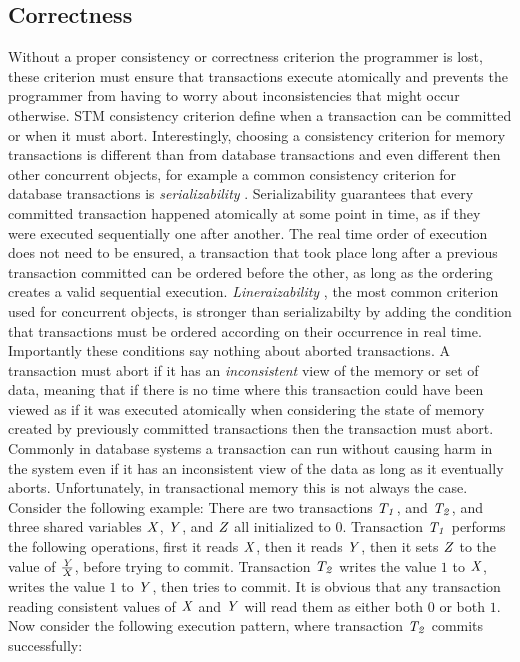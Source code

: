\subsection{Correctness}\label{sec:int-correct}

Without a proper consistency or correctness criterion the programmer is lost, these criterion must ensure that transactions execute
atomically and prevents the programmer from having to worry about inconsistencies that might occur otherwise.
STM consistency criterion define when a transaction can be committed or when it must abort. 
Interestingly, choosing a consistency criterion for memory transactions is different than from database transactions
and even different then other concurrent objects,
for example a common consistency criterion for database transactions is \emph{serializability} \cite{P79}.  
Serializability guarantees that every committed transaction happened atomically at some point in time,
 as if they were executed sequentially one after another.
The real time order of execution does not need to be ensured,
a transaction that took place long after a previous transaction committed can
 be ordered before the other, as long as the ordering creates a valid sequential execution.
\emph{Lineraizability} \cite{HW90}, the most common criterion used for concurrent objects, is stronger than serializabilty by
adding the condition that transactions must be ordered according on their occurrence in real time.
Importantly these conditions say nothing about aborted transactions.
A transaction must abort if it has an \emph{inconsistent} view of the memory or set of data,
meaning that if there is no time where this transaction could have been viewed as if it was executed atomically when considering
the state of memory created by previously committed transactions then the transaction must abort.
Commonly in database
systems a transaction can run without causing harm in the system even if it 
has an inconsistent view of the data as long as it eventually aborts.
Unfortunately, in transactional memory this is not always the case.
Consider the following example:  There are two transactions $\ms{T_1}$, and $\ms{T_2}$, and three 
shared variables $\ms{X}$, $\ms{Y}$, and $\ms{Z}$ all initialized to $0$.  Transaction $\ms{T_1}$ performs
the following operations, first it reads $\ms{X}$, then it reads $\ms{Y}$, then it sets $\ms{Z}$ to 
the value of $\frac{\ms{Y}}{\ms{X}}$, before trying to commit.
Transaction $\ms{T_2}$ writes the value $1$ to $\ms{X}$, writes the value $1$ to $\ms{Y}$, 
then tries to commit.
It is obvious that any transaction reading consistent values of $\ms{X}$ and $\ms{Y}$ 
will read them as either both $0$ or both $1$.
Now consider the following execution pattern, where transaction $\ms{T_2}$ commits successfully:

